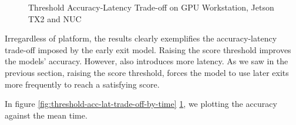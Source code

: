 \begin{figure}
	\caption[Threshold Accuracy-Latency Trade-off]{Threshold Accuracy-Latency Trade-off on \protect{} GPU Workstation, \protect{} Jetson TX2 and \protect{} NUC }
	\label{fig:threshold-acc-lat-trade-off}
\end{figure}

Irregardless of platform, the results clearly exemplifies the accuracy-latency trade-off imposed by the early exit model. Raising the score threshold improves the models' accuracy. However, also introduces more latency. As we saw in the previous section, raising the score threshold, forces the model to use later exits more frequently to reach a satisfying score. 

In figure \ref{fig:threshold-acc-lat-trade-off-by-time} \ref{fig:threshold-acc-lat-trade-off}, we plotting the accuracy against the mean time.
